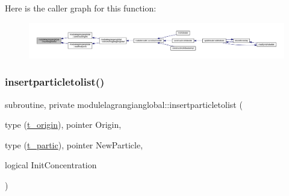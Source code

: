 Here is the caller graph for this function\+:\nopagebreak
\begin{figure}[H]
\begin{center}
\leavevmode
\includegraphics[width=350pt]{namespacemodulelagrangianglobal_ab902fc69902a11b86ed8b0b64ece38d9_icgraph}
\end{center}
\end{figure}
\mbox{\label{namespacemodulelagrangianglobal_a2d4644f4134b54b72e810da551bd14a9}} 
\subsubsection{\texorpdfstring{insertparticletolist()}{insertparticletolist()}}
{\footnotesize\ttfamily subroutine, private modulelagrangianglobal\+::insertparticletolist (\begin{DoxyParamCaption}\item[{type (\mbox{\hyperlink{structmodulelagrangianglobal_1_1t__origin}{t\+\_\+origin}}), pointer}]{Origin,  }\item[{type (\mbox{\hyperlink{structmodulelagrangianglobal_1_1t__partic}{t\+\_\+partic}}), pointer}]{New\+Particle,  }\item[{logical}]{Init\+Concentration }\end{DoxyParamCaption})\hspace{0.3cm}{\ttfamily [private]}}

